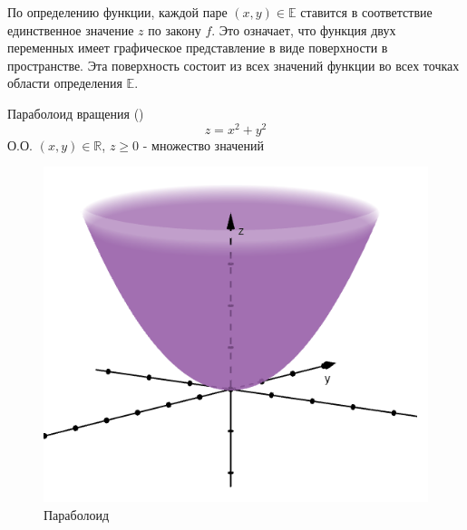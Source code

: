 По определению функции, каждой паре $(x, y) \in \mathbb{E}$ ставится в соответствие единственное значение $z$ по закону $f$. Это означает, что функция двух переменных имеет графическое представление в виде поверхности в пространстве. Эта поверхность состоит из всех значений функции во всех точках области определения $\mathbb{E}$.

\noindent
\begin{minipage}{\linewidth}
	\begin{minipage}{0.6\linewidth}
		\begin{tbox*}{Параболоид вращения ()}
			\[\boxed{z = x^2 + y^2}\]
			О.О. $(x, y) \in \mathbb{R}$, $z \geqslant 0$ - множество значений
		\end{tbox*}
	\end{minipage}
	\begin{minipage}{0.35\linewidth}
		\begin{figure}[H]
			\centering
			\includegraphics[width=0.9\linewidth]{image/screenshot004.png}
			\caption{Параболоид}
			\label{fig:1.2.1.1}
		\end{figure}
	\end{minipage}
\end{minipage}
